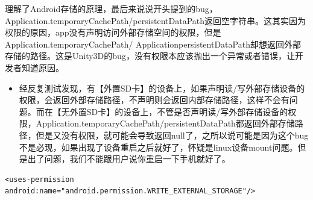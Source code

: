 \documentclass[9pt, b5paper]{article}
\begin{document}
理解了Android存储的原理，最后来说说开头提到的bug，Application.temporaryCachePath/persistentDataPath返回空字符串。这其实因为权限的原因，app没有声明访问外部存储空间的权限，但是Application.temporaryCachePath/ ApplicationpersistentDataPath却想返回外部存储的路径。这是Unity3D的bug，没有权限本应该抛出一个异常或者错误，让开发者知道原因。
\begin{itemize}
\item 经反复测试发现，有【外置SD卡】的设备上，如果声明读/写外部存储设备的权限，会返回外部存储路径，不声明则会返回内部存储路径，这样不会有问题。而在【无外置SD卡】的设备上，不管是否声明读/写外部存储设备的权限，Application.temporaryCachePath/persistentDataPath都返回外部存储路径，但是又没有权限，就可能会导致返回null了，之所以说可能是因为这个bug不是必现，如果出现了设备重启之后就好了，怀疑是linux设备mount问题。但是出了问题，我们不能跟用户说你重启一下手机就好了。
\end{itemize}
\begin{verbatim}
<uses-permission android:name="android.permission.WRITE_EXTERNAL_STORAGE"/>
\end{verbatim}
\end{document}
